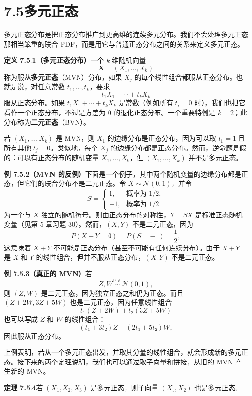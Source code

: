 \documentclass[UTF8,12pt,a4paper,fontset=fandol]{ctexart}
\begin{document}
\section*{7.5\quad 多元正态}

多元正态分布是把正态分布推广到更高维的连续多元分布。我们不会处理多元正态那相当笨重的联合 PDF，而是用它与普通正态分布之间的关系来定义多元正态。

\noindent\textbf{定义 7.5.1（多元正态分布）}\quad 一个 $k$ 维随机向量
\[
  \mathbf{X}=(X_1,\ldots,X_k)
\]
称为服从\textbf{多元正态}（MVN）分布，如果 $X_j$ 的每个线性组合都服从正态分布。也就是说，对任意常数 $t_1,\ldots,t_k$，要求
\[
  t_1X_1+\cdots+t_kX_k
\]
服从正态分布。如果 $t_1X_1+\cdots+t_kX_k$ 是常数（例如所有 $t_i=0$ 时），我们也把它看作一个正态分布，不过是方差为 $0$ 的退化正态分布。一个重要特例是 $k=2$；此分布称为\textbf{二元正态}（BVN）。

若 $(X_1,\ldots,X_k)$ 是 MVN，则 $X_1$ 的边缘分布是正态分布，因为可以取 $t_1=1$ 且所有其他 $t_j=0$。类似地，每个 $X_j$ 的边缘分布都是正态分布。然而，逆命题是假的：可以有正态分布的随机变量 $X_1,\ldots,X_k$，但 $(X_1,\ldots,X_k)$ 并不是多元正态。

\noindent\textbf{例 7.5.2（MVN 的反例）}\quad 下面是一个例子，其中两个随机变量的边缘分布都是正态，但它们的联合分布不是二元正态。令 $X\sim \mathcal{N}(0,1)$，并令
\[
  S=
  \begin{cases}
    1, & \text{概率为 }1/2,\\
    -1, & \text{概率为 }1/2
  \end{cases}
\]
为一个与 $X$ 独立的随机符号。则由正态分布的对称性，$Y=SX$ 是标准正态随机变量（见第 5 章习题 30）。然而，$(X,Y)$ 不是二元正态，因为
\[
  P(X+Y=0)=P(S=-1)=\frac12,
\]
这意味着 $X+Y$ 不可能是正态分布（甚至不可能有任何连续分布）。由于 $X+Y$ 是 $X$ 和 $Y$ 的线性组合，但并不服从正态分布，$(X,Y)$ 不是二元正态。

\noindent\textbf{例 7.5.3（真正的 MVN）}\quad 若
\[
  Z,W \stackrel{\text{i.i.d.}}{\sim}\mathcal{N}(0,1),
\]
则 $(Z,W)$ 是二元正态，因为独立正态之和仍为正态。而且 $(Z+2W,3Z+5W)$ 也是二元正态，因为任意线性组合
\[
  t_1(Z+2W)+t_2(3Z+5W)
\]
也可以写成 $Z$ 和 $W$ 的线性组合：
\[
  (t_1+3t_2)Z+(2t_1+5t_2)W,
\]
因此服从正态分布。

上例表明，若从一个多元正态出发，并取其分量的线性组合，就会形成新的多元正态。接下来的两个定理说明，我们也可以通过取子向量和拼接，从旧的 MVN 产生新的 MVN。

\noindent\textbf{定理 7.5.4}\quad 若 $(X_1,X_2,X_3)$ 是多元正态，则子向量 $(X_1,X_2)$ 也是多元正态。
\end{document}
